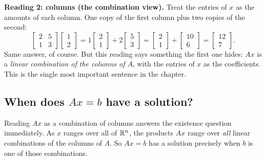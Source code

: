 \textbf{Reading 2: columns (the combination view).} Treat the entries of $x$ as the amounts of each column. One copy of the first column plus two copies of the second:
\[
\begin{bmatrix} 2 & 5\\ 1 & 3\end{bmatrix}
\begin{bmatrix} 1\\ 2\end{bmatrix}
=1\begin{bmatrix} 2\\ 1\end{bmatrix}+2\begin{bmatrix} 5\\ 3\end{bmatrix}
=\begin{bmatrix} 2\\ 1\end{bmatrix}+\begin{bmatrix} 10\\ 6\end{bmatrix}
=\begin{bmatrix} 12\\ 7\end{bmatrix}.
\]
Same answer, of course. But this reading says something the first one hides: $Ax$ is a \emph{linear combination of the columns of $A$}, with the entries of $x$ as the coefficients. This is the single most important sentence in the chapter.



\subsection{When does \texorpdfstring{$Ax=b$}{Ax=b} have a solution?}

Reading $Ax$ as a combination of columns answers the existence question immediately. As $x$ ranges over all of $\mathbb{R}^n$, the products $Ax$ range over \emph{all} linear combinations of the columns of $A$. So $Ax=b$ has a solution precisely when $b$ is one of those combinations.



